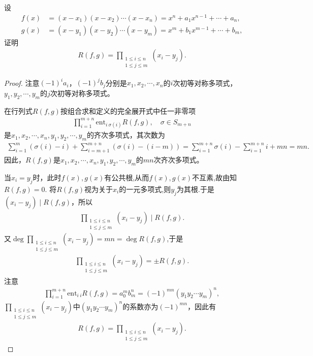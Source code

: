 \documentclass[../../main.tex]{subfiles}%
\begin{document}
\begin{proposition}\label{proposition:两个多项式的结式与根的关系}
设
\begin{align*}
f(x)&=(x-x_1)(x-x_2)\cdots(x-x_n)=x^n+a_1x^{n-1}+\cdots+a_n, \\
g(x)&=(x-y_1)(x-y_2)\cdots(x-y_m)=x^m+b_1x^{m-1}+\cdots+b_m,
\end{align*}
证明
\begin{align*}
R(f,g)=\prod\limits_{\substack{1\leqslant i\leqslant n \\ 1\leqslant j\leqslant m}}(x_i-y_j).
\end{align*}
\end{proposition}
\begin{proof}
注意$(-1)^ia_i$，$(-1)^jb_j$分别是$x_1,x_2,\cdots,x_n$的$i$次初等对称多项式，$y_1,y_2,\cdots,y_m$的$j$次初等对称多项式。

在行列式$R(f,g)$按组合求和定义的完全展开式中任一非零项
\begin{align*}
\prod\limits_{i=1}^{m+n}\mathrm{ent}_{i\ \sigma(i)}R(f,g),\quad \sigma\in S_{m+n}
\end{align*}
是$x_1,x_2,\cdots,x_n,y_1,y_2,\cdots,y_m$的齐次多项式，其次数为
\begin{align*}
\sum\limits_{i=1}^m(\sigma(i)-i)+\sum\limits_{i=m+1}^{m+n}(\sigma(i)-(i-m))=\sum\limits_{i=1}^{m+n}\sigma(i)-\sum\limits_{i=1}^{m+n}i+mn =mn.
\end{align*}
因此，$R(f,g)$是$x_1,x_2,\cdots,x_n,y_1,y_2,\cdots,y_m$的$mn$次齐次多项式。

当$x_i=y_j$时，此时$f(x),g(x)$有公共根,从而$f(x),g(x)$不互素,故由知$R(f,g)=0$.
将$R(f,g)$视为关于$x_i$的一元多项式,则$y_j$为其根.于是$(x_i-y_j)\mid R(f,g)$，所以
\begin{align*}
\prod\limits_{\substack{1\leqslant i\leqslant n \\ 1\leqslant j\leqslant m}}(x_i-y_j)\mid R(f,g).
\end{align*}
又$\deg\prod\limits_{\substack{1\leqslant i\leqslant n \\ 1\leqslant j\leqslant m}}(x_i-y_j)=mn=\deg R(f,g)$,于是
\begin{align*}
\prod\limits_{\substack{1\leqslant i\leqslant n \\ 1\leqslant j\leqslant m}}(x_i-y_j)=\pm R(f,g).
\end{align*}
注意
\begin{align*}
\prod\limits_{i=1}^{m+n}\mathrm{ent}_{i\ i}R(f,g)=a_0^mb_m^n=(-1)^{mn}(y_1y_2\cdots y_m)^n,
\end{align*}
$\prod\limits_{\substack{1\leqslant i\leqslant n \\ 1\leqslant j\leqslant m}}(x_i-y_j)$中$(y_1y_2\cdots y_m)^n$的系数亦为$(-1)^{mn}$，因此有
\begin{align*}
R(f,g)=\prod\limits_{\substack{1\leqslant i\leqslant n \\ 1\leqslant j\leqslant m}}(x_i-y_j).
\end{align*}
\end{proof}
\end{document}
